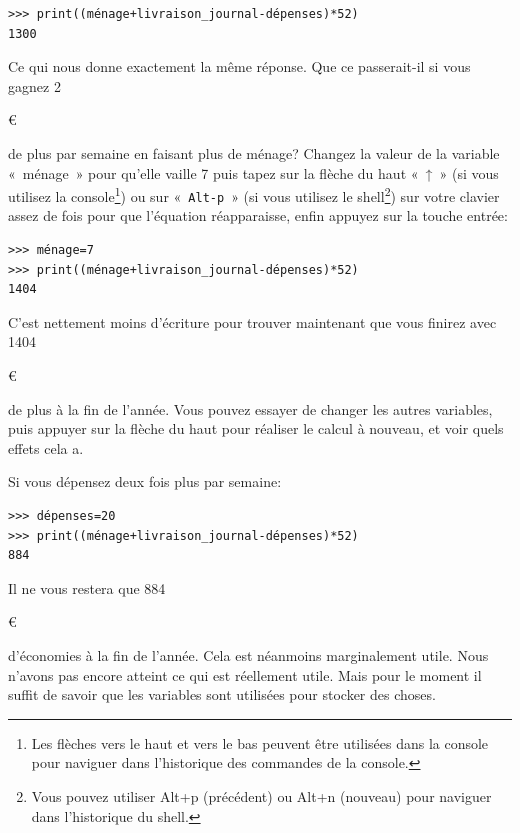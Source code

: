 \begin{Verbatim}[frame=single,rulecolor=\color{mbleu}, label=à taper]
>>> print((ménage+livraison_journal-dépenses)*52)
1300
\end{Verbatim} 

Ce qui nous donne exactement la même réponse. Que ce passerait-il si vous gagnez 
2\begin{small}\euro\end{small} de plus par semaine en faisant plus de ménage? Changez la valeur de la variable «~ménage~» pour qu'elle vaille 7 puis tapez sur la flèche du haut «~↑~» (si vous utilisez la console\footnote{Les flèches vers le haut et vers le bas peuvent être utilisées dans la console pour naviguer dans l'historique des commandes de la console.}) ou sur «~\texttt{Alt-p}~» (si vous utilisez le shell\footnote{Vous pouvez utiliser Alt+p (précédent) ou Alt+n (nouveau) pour naviguer dans l'historique du shell.}) sur votre clavier assez de fois pour que l'équation réapparaisse, enfin appuyez sur la touche entrée:\\


\begin{Verbatim}[frame=single,rulecolor=\color{mbleu}, label=à taper]
>>> ménage=7
>>> print((ménage+livraison_journal-dépenses)*52)
1404
\end{Verbatim} 

C'est nettement moins d'écriture pour trouver maintenant que vous finirez avec 1404\begin{small}\euro\end{small} de plus à la fin de l'année. Vous pouvez essayer de changer les autres variables, puis appuyer sur la flèche du haut pour réaliser le calcul à nouveau, et voir quels effets cela a.

Si vous dépensez deux fois plus par semaine:\\


\begin{Verbatim}[frame=single,rulecolor=\color{mbleu}, label=à taper]
>>> dépenses=20
>>> print((ménage+livraison_journal-dépenses)*52)
884
\end{Verbatim}
 

Il ne vous restera que 884\begin{small}\euro\end{small} d'économies à la fin de l'année. Cela est néanmoins marginalement utile. Nous n'avons pas encore atteint ce qui est réellement utile. Mais pour le moment il suffit de savoir que les variables sont utilisées pour stocker des choses.\\

